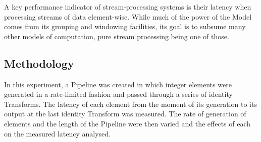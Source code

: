 A key performance indicator of stream-processing systems is their latency when processing streams of data element-wise.
While much of the power of the Model comes from its grouping and windowing facilities, its goal is to subsume many other models of computation, pure stream processing being one of those.

\subsection{Methodology}

In this experiment, a Pipeline was created in which integer elements were generated in a rate-limited fashion and passed through a series of identity Transforms.
The latency of each element from the moment of its generation to its output at the last identity Transform was measured.
The rate of generation of elements and the length of the Pipeline were then varied and the effects of each on the measured latency analysed.
